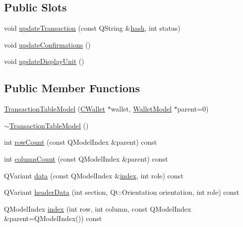 \subsection*{Public Slots}
\begin{DoxyCompactItemize}
\item 
void \hyperlink{class_transaction_table_model_abb93b1812f27622f67aed0302bc90ee6}{update\+Transaction} (const Q\+String \&\hyperlink{cache_8cc_a11ecb029164e055f28f4123ce3748862}{hash}, int status)
\item 
void \hyperlink{class_transaction_table_model_a5899d9eda6465bfb16d2846b6459567e}{update\+Confirmations} ()
\item 
void \hyperlink{class_transaction_table_model_a8b73ff7d72ec2dd69790bc61bbe8575e}{update\+Display\+Unit} ()
\end{DoxyCompactItemize}
\subsection*{Public Member Functions}
\begin{DoxyCompactItemize}
\item 
\hyperlink{class_transaction_table_model_a6c10b7cab9804eee6df9e049a978dc62}{Transaction\+Table\+Model} (\hyperlink{class_c_wallet}{C\+Wallet} $\ast$wallet, \hyperlink{class_wallet_model}{Wallet\+Model} $\ast$parent=0)
\item 
\hyperlink{class_transaction_table_model_a02b12458092e9584bc19ec7b65d8bd58}{$\sim$\+Transaction\+Table\+Model} ()
\item 
int \hyperlink{class_transaction_table_model_ae50798bd2339dca750223b2e9eb8721b}{row\+Count} (const Q\+Model\+Index \&parent) const 
\item 
int \hyperlink{class_transaction_table_model_a6608bf57c7424b84714b2810d9cf51e1}{column\+Count} (const Q\+Model\+Index \&parent) const 
\item 
Q\+Variant \hyperlink{class_transaction_table_model_a416d0751ab9a95ecd87d3f7bed4f0b06}{data} (const Q\+Model\+Index \&\hyperlink{class_transaction_table_model_aaaf3cea9a5373fff771ce81d2f26de6e}{index}, int role) const 
\item 
Q\+Variant \hyperlink{class_transaction_table_model_a0e114cae04d5a5ec03d82a80ea1d2594}{header\+Data} (int section, Qt\+::\+Orientation orientation, int role) const 
\item 
Q\+Model\+Index \hyperlink{class_transaction_table_model_aaaf3cea9a5373fff771ce81d2f26de6e}{index} (int row, int column, const Q\+Model\+Index \&parent=Q\+Model\+Index()) const 
\end{DoxyCompactItemize}
